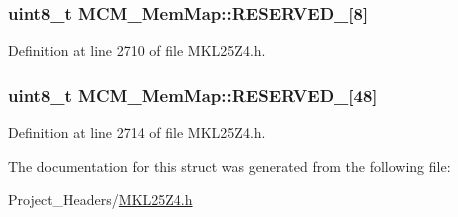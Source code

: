 \subsubsection[{\texorpdfstring{R\+E\+S\+E\+R\+V\+E\+D\+\_\+0}{RESERVED_0}}]{\setlength{\rightskip}{0pt plus 5cm}uint8\+\_\+t M\+C\+M\+\_\+\+Mem\+Map\+::\+R\+E\+S\+E\+R\+V\+E\+D\+\_\mbox{[}8\mbox{]}}\hypertarget{struct_m_c_m___mem_map_aa03546833695c701bce946849c4acf8b}{}\label{struct_m_c_m___mem_map_aa03546833695c701bce946849c4acf8b}


Definition at line 2710 of file M\+K\+L25\+Z4.\+h.

\subsubsection[{\texorpdfstring{R\+E\+S\+E\+R\+V\+E\+D\+\_\+1}{RESERVED_1}}]{\setlength{\rightskip}{0pt plus 5cm}uint8\+\_\+t M\+C\+M\+\_\+\+Mem\+Map\+::\+R\+E\+S\+E\+R\+V\+E\+D\+\_\mbox{[}48\mbox{]}}\hypertarget{struct_m_c_m___mem_map_a11d8df331970d7ffaf79e23b95c82b89}{}\label{struct_m_c_m___mem_map_a11d8df331970d7ffaf79e23b95c82b89}


Definition at line 2714 of file M\+K\+L25\+Z4.\+h.



The documentation for this struct was generated from the following file\+:\begin{DoxyCompactItemize}
\item 
Project\+\_\+\+Headers/\hyperlink{_m_k_l25_z4_8h}{M\+K\+L25\+Z4.\+h}\end{DoxyCompactItemize}
